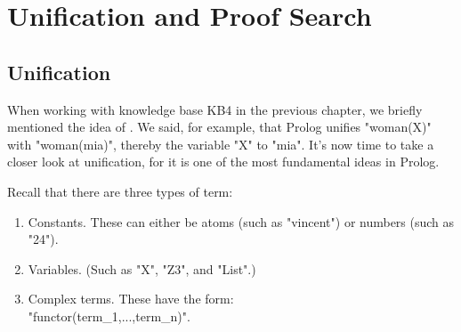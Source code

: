 

\chapter{Unification and Proof Search}\label{CHAPTER2}

\section{Unification}\label{SEC.L2.UNIFICATION}



When working with knowledge base KB4 in the previous chapter, we
briefly mentioned the idea of . We said, for
example, that Prolog unifies "woman(X)" with "woman(mia)", thereby
 the variable "X" to "mia". It's now time to take a
closer look at unification, for it is one of the most fundamental
ideas in Prolog.

Recall that there are three types of term:

\begin{enumerate}
\item{}Constants. These can either be atoms (such as "vincent") or numbers
(such as "24").
\item{}Variables. (Such as "X", "Z3", and "List".)
\item{}Complex terms. These have the form:\\ "functor(term_1,...,term_n)".
\end{enumerate}

